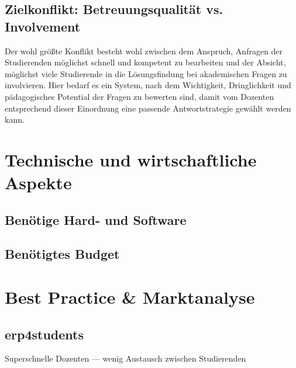 
\subsection{Zielkonflikt: Betreuungsqualität vs. Involvement} %
\label{sub:zielkonflikt_betreuungsqualitat_vs_involvement}
Der wohl größte Konflikt besteht wohl zwischen dem Anspruch, Anfragen der Studierenden möglichst schnell und kompetent zu bearbeiten und der Absicht, möglichst viele Studierende in die Lösungsfindung bei akademischen Fragen zu involvieren. Hier bedarf es ein System, nach dem Wichtigkeit, Dringlichkeit und pädagogisches Potential der Fragen zu bewerten sind, damit vom Dozenten entsprechend dieser Einordnung eine passende Antwortstrategie gewählt werden kann. 






\section{Technische und wirtschaftliche Aspekte} %
\label{sec:technische_und_wirtschaftliche_aspekte}

\subsection{Benötige Hard- und Software} %
\label{sub:benotige_hard_und_software}


\subsection{Benötigtes Budget} %
\label{sub:benotigtes_budget}



\section{Best Practice \& Marktanalyse} %
\label{sec:best_practice}

\subsection{erp4students} %
\label{sub:erp4students}
Superschnelle Dozenten --- wenig Austausch zwischen Studierenden

